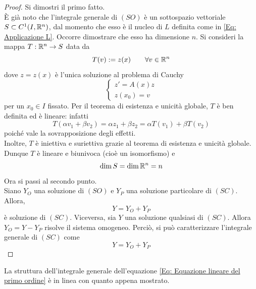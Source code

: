 \begin{proof}
    Si dimostri il primo fatto.\\
    È già noto che l'integrale generale di $(SO)$ è un sottospazio vettoriale $S \subset C^1(I, \mathbb{R}^n)$, dal momento che esso è il nucleo di $L$ definita come in \eqref{Eq: Applicazione L}. Occorre dimostrare che esso ha dimensione $n$.
    Si consideri la mappa $T: \mathbb{R}^n\to S$ data da
    \begin{equation*}
        T(v):=z(x) \qquad \forall v \in \mathbb{R}^n
    \end{equation*}
    dove $z=z(x)$ è l'unica soluzione al problema di Cauchy \begin{equation*}
        \begin{cases}    
        z'=A(x)z\\
        z(x_0)= v
        \end{cases}
    \end{equation*}
    per un $x_0 \in I$ fissato. Per il teorema di esistenza e unicità globale, $T$ è ben definita ed è lineare: infatti
    \begin{equation*}
        T(\alpha v_1 + \beta v_2)= \alpha z_1 + \beta z_2 = \alpha T(v_1)+ \beta T(v_2)
    \end{equation*}
    poiché vale la sovrapposizione degli effetti.\\
    Inoltre, $T$ è iniettiva e suriettiva grazie al teorema di esistenza e unicità globale. Dunque $T$ è lineare e biunivoca (cioè un isomorfismo) e \begin{equation*}
        \dim S = \dim \mathbb{R}^n = n
    \end{equation*}
    Ora si passi al secondo punto.\\
    Siano $Y_O$ una soluzione di $(SO)$ e $Y_P$ una soluzione particolare di $(SC)$. Allora,
    \begin{equation*}
        Y=Y_O+Y_P
    \end{equation*}
    è soluzione di $(SC)$. Viceversa, sia $Y$ una soluzione qualsiasi di $(SC)$. Allora $Y_O=Y-Y_P$ risolve il sistema omogeneo. Perciò, si può caratterizzare l'integrale generale di $(SC)$ come 
    \begin{equation*}
        Y=Y_O+Y_P
    \end{equation*}
\end{proof} 
\begin{oss}
    La struttura dell'integrale generale dell'equazione \eqref{Eq: Equazione lineare del primo ordine} è in linea con quanto appena mostrato.
\end{oss}
